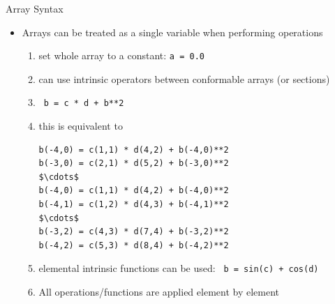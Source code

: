 \documentclass[c,mathserif,compress,xcolor=svgnames]{beamer}
\newcommand{\lstfortran}[1]{\lstinline[language={[90]Fortran},basicstyle=\footnotesize\ttfamily]|#1|}
\begin{document}
\begin{frame}[fragile]{Array Syntax}
  \begin{itemize}
    \item Arrays can be treated as a single variable when performing operations
    \begin{enumerate}
      \item set whole array to a constant: \lstfortran{a = 0.0}
      \item can use intrinsic operators between conformable arrays (or sections)
      \item[] {\lstfortran{ b = c * d + b**2 }}
      \item[] this is equivalent to
        \begin{lstlisting}[language={[90]Fortran},mathescape]
b(-4,0) = c(1,1) * d(4,2) + b(-4,0)**2 
b(-3,0) = c(2,1) * d(5,2) + b(-3,0)**2 
$\cdots$
b(-4,0) = c(1,1) * d(4,2) + b(-4,0)**2 
b(-4,1) = c(1,2) * d(4,3) + b(-4,1)**2 
$\cdots$
b(-3,2) = c(4,3) * d(7,4) + b(-3,2)**2 
b(-4,2) = c(5,3) * d(8,4) + b(-4,2)**2 
        \end{lstlisting}
      \item elemental intrinsic functions can be used: \lstfortran{ b = sin(c) + cos(d)}
      \item All operations/functions are applied element by element
    \end{enumerate}
  \end{itemize}
\end{frame}
\end{document}
